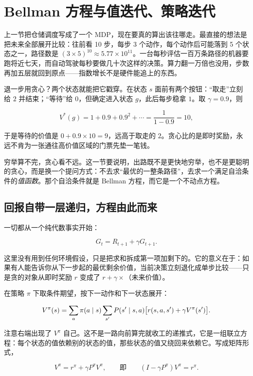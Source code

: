 \section{Bellman 方程与值迭代、策略迭代}
\label{sec:16-Control-and-Reinforcement-Learning/02-Reinforcement-Learning/02}

上一节把仓储调度写成了一个 MDP，现在要真的算出该往哪走。最直接的想法是把未来全部展开比较：往前看 10 步，每步 3 个动作，每个动作后可能落到 5 个状态之一，路径数是 \((3\times 5)^{10}\approx 5.77\times 10^{11}\)。一台每秒评估一百万条路径的机器要跑将近七天，而自动驾驶每秒要做几十次这样的决策。算力翻一万倍也没用，步数再加五层就回到原点——指数增长不是硬件能追上的东西。

退一步用贪心？两个状态就能把它戳穿。在状态 \(s\) 面前有两个按钮：``取走''立刻给 \(2\) 并结束；``等待''给 \(0\)，但确定进入状态 \(g\)，此后每步稳拿 \(1\)。取 \(\gamma=0.9\)，则

\[
V^*(g)=1+0.9+0.9^2+\cdots=\frac{1}{1-0.9}=10,
\]

于是等待的价值是 \(0+0.9\times 10=9\)，远高于取走的 \(2\)。贪心比的是即时奖励，永远不肯为一张通往高价值区域的门票先垫一笔钱。

穷举算不完，贪心看不远。这一节要说明，出路既不是更快地穷举，也不是更聪明的贪心，而是换一个提问方式：不去求``最优的一整条路径''，去求一个满足自洽条件的\emph{值函数}。那个自洽条件就是 Bellman 方程，而它是一个不动点方程。

\subsection{回报自带一层递归，方程由此而来}

一切都从一个纯代数事实开始：

\[
G_t = R_{t+1} + \gamma G_{t+1}.
\]

这里没有用到任何环境假设，只是把求和拆成第一项加剩下的。它的意义在于：如果有人能告诉你从下一步起的最优剩余价值，当前决策立刻退化成单步比较——只是贪的对象从即时奖励 \(r\) 变成了 \(r+\gamma\times\)（未来价值）。

在策略 \(\pi\) 下取条件期望，按下一动作和下一状态展开：

\[
V^\pi(s) = \sum_a \pi(a \mid s) \sum_{s'} P(s' \mid s, a)
\bigl[ r(s, a, s') + \gamma V^\pi(s') \bigr].
\]

注意右端出现了 \(V^\pi\) 自己。这不是一路向前算完就收工的递推式，它是一组联立方程：每个状态的值依赖别的状态的值，那些状态的值又绕回来依赖它。写成矩阵形式，

\[
V^\pi = r^\pi + \gamma P^\pi V^\pi,
\qquad\text{即}\qquad
(I - \gamma P^\pi) V^\pi = r^\pi.
\]

